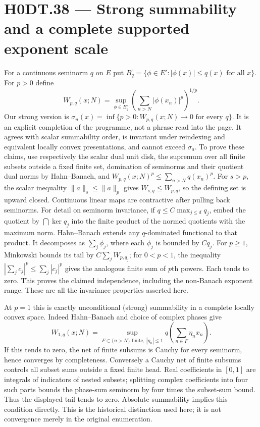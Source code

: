 \section*{H0DT.38 --- Strong summability and a complete supported exponent scale}
For a continuous seminorm $q$ on $E$ put $B_q^\circ=\{\phi\in E':|\phi(x)|\le q(x)\text{ for all }x\}$. For $p>0$ define
\[
 W_{p,q}(x;N)=\sup_{\phi\in B_q^\circ}\left(\sum_{n>N}|\phi(x_n)|^p\right)^{1/p}.
\]
Our strong version is $\sigma_u(x)=\inf\{p>0:W_{p,q}(x;N)\to0\text{ for every }q\}$. It is an explicit completion of the programme, not a phrase read into the page. It agrees with scalar summability order, is invariant under reindexing and equivalent locally convex presentations, and cannot exceed $\sigma_a$. To prove these claims, use respectively the scalar dual unit disk, the supremum over all finite subsets outside a fixed finite set, domination of seminorms and their quotient dual norms by Hahn--Banach, and
$W_{p,q}(x;N)^p\le\sum_{n>N}q(x_n)^p$. For $s>p$, the scalar inequality $\|a\|_s\le\|a\|_p$ gives $W_{s,q}\le W_{p,q}$, so the defining set is upward closed. Continuous linear maps are contractive after pulling back seminorms. For detail on seminorm invariance, if $q\le C\max_{j\le d}q_j$, embed the quotient by $\bigcap\ker q_j$ into the finite product of the normed quotients with the maximum norm. Hahn--Banach extends any $q$-dominated functional to that product. It decomposes as $\sum_j\phi_j$, where each $\phi_j$ is bounded by $Cq_j$. For $p\ge1$, Minkowski bounds its tail by $C\sum_jW_{p,q_j}$; for $0<p<1$, the inequality $|\sum_jc_j|^p\le\sum_j|c_j|^p$ gives the analogous finite sum of $p$th powers. Each tends to zero. This proves the claimed independence, including the non-Banach exponent range. These are all the invariance properties asserted here.

At $p=1$ this is exactly unconditional (strong) summability in a complete locally convex space. Indeed Hahn--Banach and choice of complex phases give
\[
 W_{1,q}(x;N)=\sup_{F\subset\{n>N\}\text{ finite},\ |\eta_n|\le1}
 q\left(\sum_{n\in F}\eta_nx_n\right).
\]
If this tends to zero, the net of finite subsums is Cauchy for every seminorm, hence converges by completeness. Conversely a Cauchy net of finite subsums controls all subset sums outside a fixed finite head. Real coefficients in $[0,1]$ are integrals of indicators of nested subsets; splitting complex coefficients into four such parts bounds the phase-sum seminorm by four times the subset-sum bound. Thus the displayed tail tends to zero. Absolute summability implies this condition directly. This is the historical distinction used here; it is not convergence merely in the original enumeration.

